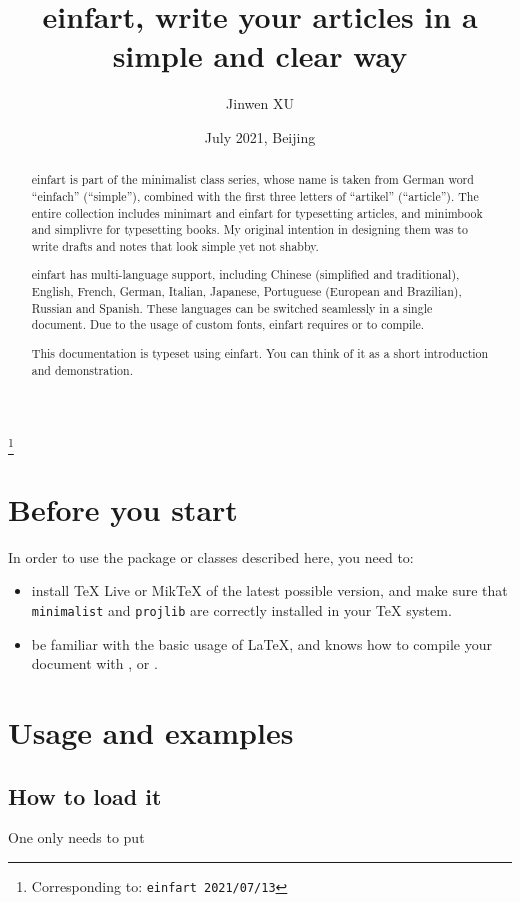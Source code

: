 \documentclass[English,Chinese,French,puretext]{einfart}
\providecommand{\minimalist}{\textsf{minimalist}}
\providecommand{\minimart}{\textsf{minimart}}
\providecommand{\minimbook}{\textsf{minimbook}}
\providecommand{\einfart}{\textsf{einfart}}
\providecommand{\simplivre}{\textsf{simplivre}}
\let\LevelOneTitle\section
\let\LevelTwoTitle\subsection
\begin{document}
\title{\einfart{}, write your articles in a simple and clear way}
\author{Jinwen XU}
\thanks{Corresponding to: \texttt{\einfart{} 2021/07/13}}
\date{July 2021, Beijing}

\maketitle

\begin{abstract}
    \einfart{} is part of the \minimalist{} class series, whose name is taken from German word ``einfach'' (``simple''), combined with the first three letters of ``artikel'' (``article''). The entire collection includes \minimart{} and \einfart{} for typesetting articles, and \minimbook{} and \simplivre{} for typesetting books. My original intention in designing them was to write drafts and notes that look simple yet not shabby.

    \einfart{} has multi-language support, including Chinese (simplified and traditional), English, French, German, Italian, Japanese, Portuguese (European and Brazilian), Russian and Spanish. These languages can be switched seamlessly in a single document. Due to the usage of custom fonts, \einfart{} requires  or  to compile.

    This documentation is typeset using \einfart{}. You can think of it as a short introduction and demonstration.
\end{abstract}


\setcounter{tocdepth}{2}
\tableofcontents


\medskip
\LevelOneTitle*{Before you start}
In order to use the package or classes described here, you need to:
\begin{itemize}
    \item install TeX Live or MikTeX of the latest possible version, and make sure that \texttt{minimalist} and \texttt{projlib} are correctly installed in your \TeX{} system.
    \item be familiar with the basic usage of \LaTeX{}, and knows how to compile your document with ,  or .
\end{itemize}


\LevelOneTitle{Usage and examples}

\LevelTwoTitle{How to load it}

One only needs to put
\end{document}
